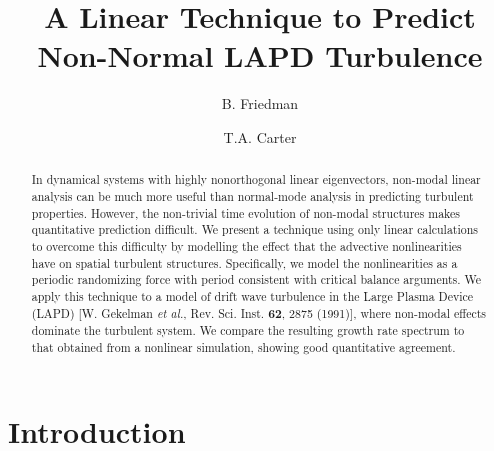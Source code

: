 \documentclass[showpacs,preprintnumbers,amsmath,amssymb,superscriptaddress,aip]{revtex4-1}
\begin{document}
\title{A Linear Technique to Predict Non-Normal LAPD Turbulence}

\author{B. Friedman}

\author{T.A. Carter}




\begin{abstract}
In dynamical systems with highly nonorthogonal linear eigenvectors, non-modal linear analysis can be much more useful than normal-mode analysis in predicting turbulent properties. 
However, the non-trivial time evolution of non-modal structures makes quantitative prediction difficult. We present a technique using only linear calculations to overcome
this difficulty by modelling the effect that the advective nonlinearities have on spatial turbulent structures. Specifically, we model the nonlinearities as a periodic randomizing force with
period consistent with critical balance arguments. We apply this technique to a model of drift wave turbulence in the Large Plasma Device (LAPD) 
[W. Gekelman \emph{et al.}, Rev. Sci. Inst. {\bf 62}, 2875 (1991)], where non-modal effects dominate the turbulent system. 
We compare the resulting growth rate spectrum to that obtained from a nonlinear simulation, showing good quantitative agreement.
\end{abstract}

\maketitle

\section{Introduction}
\end{document}
